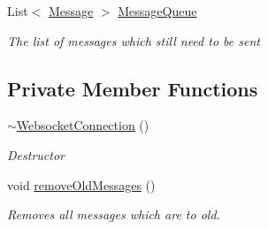 \begin{DoxyCompactItemize}
List$<$ \hyperlink{class_web_analyzer_1_1_models_1_1_message_model_1_1_message}{Message} $>$ \hyperlink{class_web_analyzer_1_1_server_1_1_websocket_connection_a0351f67ba0d69e6d5701ef34395e0a59}{Message\+Queue}
\begin{DoxyCompactList}\small\item\em The list of messages which still need to be sent \end{DoxyCompactList}\end{DoxyCompactItemize}
\subsection*{Private Member Functions}
\begin{DoxyCompactItemize}
\item 
\hyperlink{class_web_analyzer_1_1_server_1_1_websocket_connection_a734b1ec862ae9693901fa28b99c03922}{$\sim$\+Websocket\+Connection} ()
\begin{DoxyCompactList}\small\item\em Destructor \end{DoxyCompactList}\item 
void \hyperlink{class_web_analyzer_1_1_server_1_1_websocket_connection_ab856bbd336338d41ea2196df96a39521}{remove\+Old\+Messages} ()
\begin{DoxyCompactList}\small\item\em Removes all messages which are to old. \end{DoxyCompactList}\end{DoxyCompactItemize}

